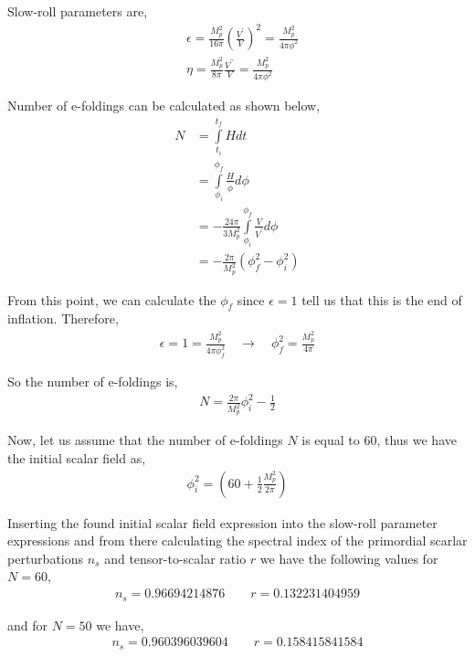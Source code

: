 Slow-roll parameters are,
\begin{align}
&\epsilon = \frac{M_{p}^{2}}{16\pi}\left(\frac{V^{\prime}}{V}\right)^{2} = \frac{M_{p}^{2}}{4\pi \phi^{2}}\\
&\eta = \frac{M_{p}^{2}}{8\pi}\frac{V^{\prime\prime}}{V} = \frac{M_{p}^{2}}{4\pi\phi^{2}}
\end{align}

Number of e-foldings can be calculated as shown below,
\begin{align}
N &= \int\limits_{t_{i}}^{t_{f}}Hdt\\
&= \int\limits_{\phi_{i}}^{\phi_{f}}\frac{H}{\dot{\phi}}d\phi\\
&= -\frac{24\pi}{3M_{p}^{2}}\int\limits_{\phi_{i}}^{\phi_{f}}\frac{V}{V^{\prime}}d\phi\\
&= -\frac{2\pi}{M_{p}^{2}}\left(\phi_{f}^{2} - \phi_{i}^{2}\right)
\end{align}

From this point, we can calculate the $\phi_f$ since $\epsilon = 1$ tell us that this is the end of inflation. Therefore,
\begin{align}
\epsilon = 1 = \frac{M_{p}^{2}}{4\pi\phi_{f}^{2}}\quad\rightarrow\quad\phi_{f}^{2} = \frac{M_{p}^{2}}{4\pi}
\end{align}

So the number of e-foldings is,
\begin{align}
N = \frac{2\pi}{M_{p}^{2}}\phi_{i}^{2} - \frac{1}{2}
\end{align}

Now, let us assume that the number of e-foldings $N$ is equal to $60$, thus we have the initial scalar field as,
\begin{align}
\phi_{i}^{2} = \left(60 + \frac{1}{2}\frac{M_{p}^{2}}{2\pi}\right)
\end{align}

Inserting the found initial scalar field expression into the slow-roll parameter expressions and from there calculating the spectral index of the primordial scarlar perturbations $n_{s}$ and tensor-to-scalar ratio $r$ we have the following values for $N=60$,
\begin{align}
n_{s} = 0.96694214876\quad\quad r = 0.132231404959
\end{align}

and for $N=50$ we have,
\begin{align}
n_{s} = 0.960396039604\quad\quad r = 0.158415841584
\end{align}


